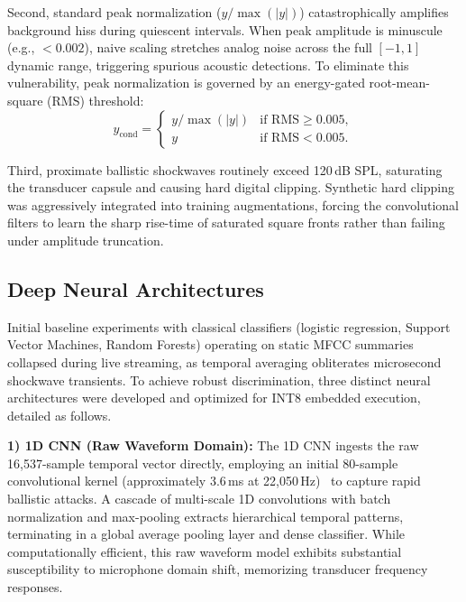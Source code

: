 \documentclass[conference]{IEEEtran}
\begin{document}
Second, standard peak normalization ($y/\max(|y|)$) catastrophically amplifies background hiss during quiescent intervals. When peak amplitude is minuscule (e.g., $<0.002$), naive scaling stretches analog noise across the full $[-1, 1]$ dynamic range, triggering spurious acoustic detections. To eliminate this vulnerability, peak normalization is governed by an energy-gated root-mean-square (RMS) threshold:
\begin{equation}
    y_{\mathrm{cond}} =
    \begin{cases}
        y / \max(|y|) & \text{if RMS} \ge 0.005, \\
        y & \text{if RMS} < 0.005.
    \end{cases}
    \label{eq:energy_gate}
\end{equation}

Third, proximate ballistic shockwaves routinely exceed 120\,dB SPL, saturating the transducer capsule and causing hard digital clipping. Synthetic hard clipping was aggressively integrated into training augmentations, forcing the convolutional filters to learn the sharp rise-time of saturated square fronts rather than failing under amplitude truncation.

\subsection{Deep Neural Architectures}
\label{subsec:neural_architectures}

Initial baseline experiments with classical classifiers (logistic regression, Support Vector Machines, Random Forests) operating on static MFCC summaries collapsed during live streaming, as temporal averaging obliterates microsecond shockwave transients. To achieve robust discrimination, three distinct neural architectures were developed and optimized for INT8 embedded execution, detailed as follows.

\textbf{1) 1D CNN (Raw Waveform Domain):} The 1D CNN ingests the raw 16,537-sample temporal vector directly, employing an initial 80-sample convolutional kernel (approximately 3.6\,ms at 22,050\,Hz)~\cite{dai2017} to capture rapid ballistic attacks. A cascade of multi-scale 1D convolutions with batch normalization and max-pooling extracts hierarchical temporal patterns, terminating in a global average pooling layer and dense classifier. While computationally efficient, this raw waveform model exhibits substantial susceptibility to microphone domain shift, memorizing transducer frequency responses.
\end{document}
